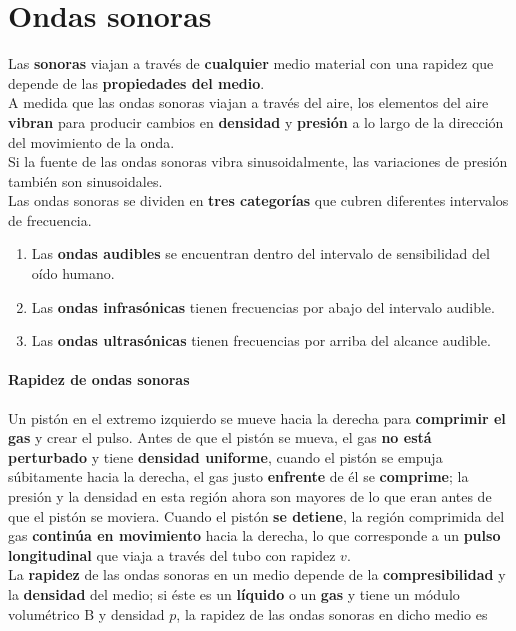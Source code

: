 \documentclass[10pt]{article}
\begin{document}
\section{Ondas sonoras}
Las \textbf{sonoras} viajan a través de \textbf{cualquier } medio material con una rapidez que depende
de las \textbf{propiedades del medio}.\\
\linebreak
A medida que las ondas sonoras viajan a través del aire, los
elementos del aire \textbf{vibran} para producir cambios en \textbf{densidad} y \textbf{presión} a lo largo de la
dirección del movimiento de la onda.\\ 
\linebreak
Si la fuente de las ondas sonoras vibra sinusoidalmente, las variaciones de presión también son sinusoidales.\\
\linebreak
Las ondas sonoras se dividen en \textbf{tres categorías} que cubren diferentes intervalos de frecuencia.\\ 
\begin{enumerate}
	\item Las \textbf{ondas audibles} se encuentran dentro del intervalo de sensibilidad del oído
		humano.
	\item Las \textbf{ondas infrasónicas} tienen frecuencias por abajo del
		intervalo audible.
	\item Las \textbf{ondas ultrasónicas} tienen frecuencias por arriba del alcance audible.
\end{enumerate}

\paragraph{Rapidez de ondas sonoras}

Un pistón en el extremo izquierdo se mueve hacia la derecha para \textbf{comprimir el gas} y crear el pulso.
Antes de que el pistón se mueva, el gas \textbf{no está perturbado} y tiene \textbf{densidad uniforme},
cuando el pistón se empuja súbitamente hacia la derecha, el gas justo \textbf{enfrente} de él se \textbf{comprime};
la presión y la densidad en esta región ahora son mayores de lo que eran antes de que el
pistón se moviera. Cuando el pistón \textbf{se detiene}, la región comprimida del
gas \textbf{continúa en movimiento} hacia la derecha, lo que corresponde a un \textbf{pulso longitudinal}
que viaja a través del tubo con rapidez $v$.\\
\linebreak
La \textbf{rapidez} de las ondas sonoras en un medio depende de la \textbf{compresibilidad} y la \textbf{densidad} del medio; si éste es un \textbf{líquido} o un \textbf{gas} y tiene un módulo volumétrico B y densidad $p$, la rapidez de las ondas sonoras en dicho medio es
\end{document}
